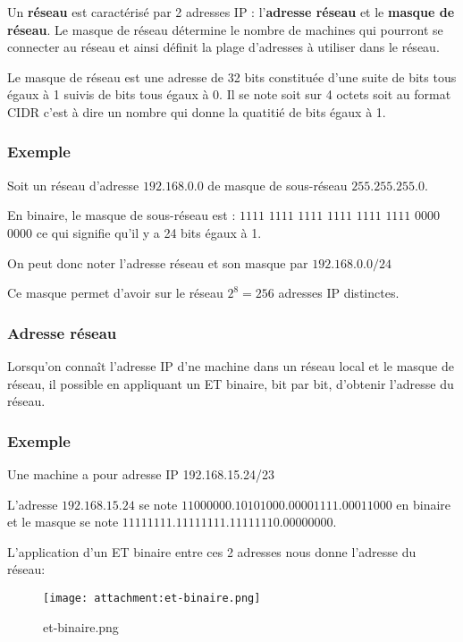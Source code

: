 \documentclass[11pt]{article}
\begin{document}
Un \textbf{réseau} est caractérisé par 2 adresses IP : l'\textbf{adresse
réseau} et le \textbf{masque de réseau}. Le masque de réseau détermine
le nombre de machines qui pourront se connecter au réseau et ainsi
définit la plage d'adresses à utiliser dans le réseau.

Le masque de réseau est une adresse de 32 bits constituée d'une suite de
bits tous égaux à 1 suivis de bits tous égaux à 0. Il se note soit sur 4
octets soit au format CIDR c'est à dire un nombre qui donne la quatitié
de bits égaux à 1.

\hypertarget{exemple}{%
\subsubsection{Exemple}\label{exemple}}

Soit un réseau d'adresse \(192.168.0.0\) de masque de sous-réseau
\(255.255.255.0\).

En binaire, le masque de sous-réseau est : \(1111\) \(1111\) \(1111\)
\(1111\) \(1111\) \(1111\) \(0000\) \(0000\) ce qui signifie qu'il y a
24 bits égaux à 1.

On peut donc noter l'adresse réseau et son masque par \(192.168.0.0/24\)

Ce masque permet d'avoir sur le réseau \(2^{8}=256\) adresses IP
distinctes.

    \hypertarget{adresse-ruxe9seau}{%
\subsubsection{Adresse réseau}\label{adresse-ruxe9seau}}

Lorsqu'on connaît l'adresse IP d'ne machine dans un réseau local et le
masque de réseau, il possible en appliquant un ET binaire, bit par bit,
d'obtenir l'adresse du réseau.

\hypertarget{exemple}{%
\subsubsection{Exemple}\label{exemple}}

Une machine a pour adresse IP 192.168.15.24/23

L'adresse \(192.168.15.24\) se note
\(1100 0000.1010 1000.0000 1111.0001 1000\) en binaire et le masque se
note \(1111 1111.1111 1111.1111 1110.0000 0000\).

L'application d'un ET binaire entre ces 2 adresses nous donne l'adresse
du réseau:

    \begin{figure}
\centering
\texttt{[image: attachment:et-binaire.png]}
\caption{et-binaire.png}
\end{figure}
\end{document}
